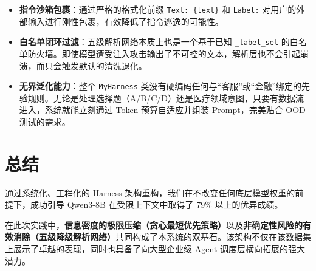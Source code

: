 \documentclass[11pt, a4paper]{ctexart}
\begin{document}
\begin{itemize}
    \item \textbf{指令沙箱包裹}：通过严格的格式化前缀 \texttt{Text: \{text\}} 和 \texttt{Label:} 对用户的外部输入进行刚性包裹，有效降低了指令逃逸的可能性。
    \item \textbf{白名单闭环过滤}：五级解析网络本质上也是一个基于已知 \texttt{\_label\_set} 的白名单防火墙。即使模型遭受注入攻击输出了不可控的文本，解析层也不会引起崩溃，而只会触发默认的清洗退化。
    \item \textbf{无界泛化能力}：整个 \texttt{MyHarness} 类没有硬编码任何与“客服”或“金融”绑定的先验规则。无论是处理选择题（A/B/C/D）还是医疗领域意图，只要有数据流进入，系统就能立刻通过 Token 预算自适应并组装 Prompt，完美贴合 OOD 测试的需求。
\end{itemize}

\section{总结}

通过系统化、工程化的 Harness 架构重构，我们在不改变任何底层模型权重的前提下，成功引导 Qwen3-8B 在受限上下文中取得了 79\% 以上的优异成绩。

在此次实践中，\textbf{信息密度的极限压缩（贪心最短优先策略）}以及\textbf{非确定性风险的有效消除（五级降级解析网络）}共同构成了本系统的双基石。该架构不仅在该数据集上展示了卓越的表现，同时也具备了向大型企业级 Agent 调度层横向拓展的强大潜力。
\end{document}
